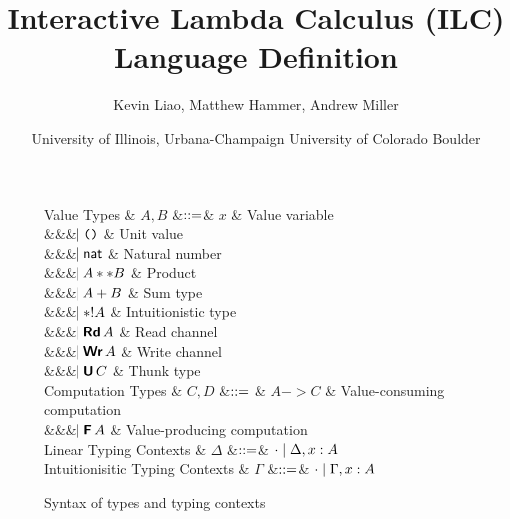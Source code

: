 \documentclass[10pt]{article}
\begin{document}
\title{Interactive Lambda Calculus (ILC) Language Definition}
\author{Kevin Liao\textsuperscript{\textasteriskcentered},
        Matthew Hammer\textsuperscript{\textdagger},
        Andrew Miller\textsuperscript{\textasteriskcentered}}
\date{\textsuperscript{\textasteriskcentered} University of Illinois,
  Urbana-Champaign \hspace{0.5cm} \textsuperscript{\textdagger} University of
  Colorado Boulder}

\maketitle
\thispagestyle{empty}

\begin{figure}[htbp]
  \centering

\begin{grammar}
  Value Types
  & $A,B$
      &$\mathrel{::=}$&
      $x$ & Value variable
      \\ &&& $\hspace{-1.02ex}\mathrel{\mid} \texttt{()}$ & Unit value
      \\ &&& $\hspace{-1.02ex}\mathrel{\mid} \mathsf{nat}$         & Natural number
      \\ &&& $\hspace{-1.02ex}\mathrel{\mid} A ** B$ & Product
      \\ &&& $\hspace{-1.02ex}\mathrel{\mid} A + B$ & Sum type
      \\ &&& $\hspace{-1.02ex}\mathrel{\mid} *! A$ & Intuitionistic type
      \\ &&& $\bnfaltbrk \tyRd{A}$ & Read channel
      \\ &&& $\bnfaltbrk \tyWr{A}$ & Write channel
      \\ &&& $\bnfaltbrk \tyU{C}$ & Thunk type
  \\[1ex]
  Computation Types
  & $C, D$
      &$\mathrel{::=}$ & 
             $A -> C$ & Value-consuming computation
      \\ &&& $\bnfaltbrk \tyF{A}$ & Value-producing computation
  \\[1ex]
  Linear Typing Contexts
  & $\Delta$
     &$\mathrel{::=}$& $\cdot \mathrel{\mid} \Delta,x:A$
  \\
  Intuitionisitic Typing Contexts
  & $\Gamma$
     &$\mathrel{::=}$& $\cdot \mathrel{\mid} \Gamma,x:A$
\end{grammar}

  \caption{Syntax of types and typing contexts}
  \label{fig:expr}
\end{figure}
\end{document}
